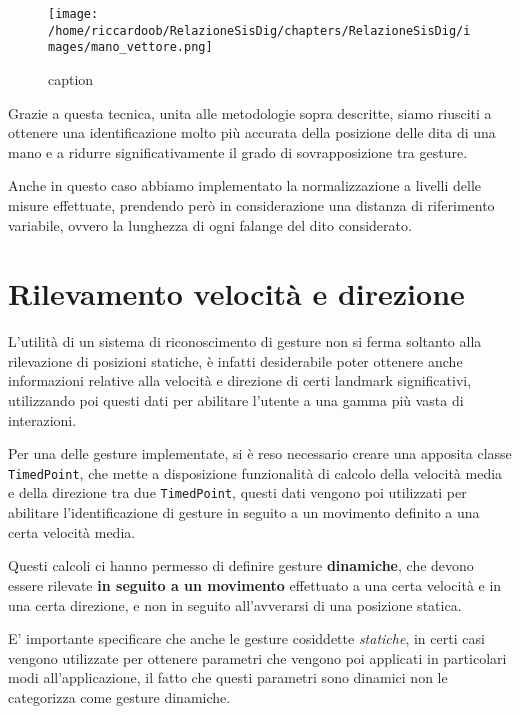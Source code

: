 \begin{figure}[H]
    \caption{caption}
    \centering
    \texttt{[image: /home/riccardoob/RelazioneSisDig/chapters/RelazioneSisDig/images/mano\_vettore.png]}
\end{figure}

Grazie a questa tecnica, unita alle metodologie sopra descritte, siamo riusciti a ottenere una identificazione molto più accurata della posizione delle dita di una mano e a ridurre significativamente il grado di sovrapposizione tra gesture.

Anche in questo caso abbiamo implementato la normalizzazione a livelli delle misure effettuate, prendendo però in considerazione una distanza di riferimento variabile, ovvero la lunghezza di ogni falange del dito considerato.

\section{Rilevamento velocità e direzione}

L'utilità di un sistema di riconoscimento di gesture non si ferma soltanto alla rilevazione di posizioni statiche, è infatti desiderabile poter ottenere anche informazioni relative alla velocità e direzione di certi landmark significativi, utilizzando poi questi dati per abilitare l'utente a una gamma più vasta di interazioni.

Per una delle gesture implementate, si è reso necessario creare una apposita classe \texttt{TimedPoint}, che mette a disposizione funzionalità di calcolo della velocità media e della direzione tra due \texttt{TimedPoint}, questi dati vengono poi utilizzati per abilitare l'identificazione di gesture in seguito a un movimento definito a una certa velocità media.

Questi calcoli ci hanno permesso di definire gesture \textbf{dinamiche}, che devono essere rilevate \textbf{in seguito a un movimento} effettuato a una certa velocità e in una certa direzione, e non in seguito all'avverarsi di una posizione statica.

E' importante specificare che anche le gesture cosiddette \textit{statiche}, in certi casi vengono utilizzate per ottenere parametri che vengono poi applicati in particolari modi all'applicazione, il fatto che questi parametri sono dinamici non le categorizza come gesture dinamiche. 


